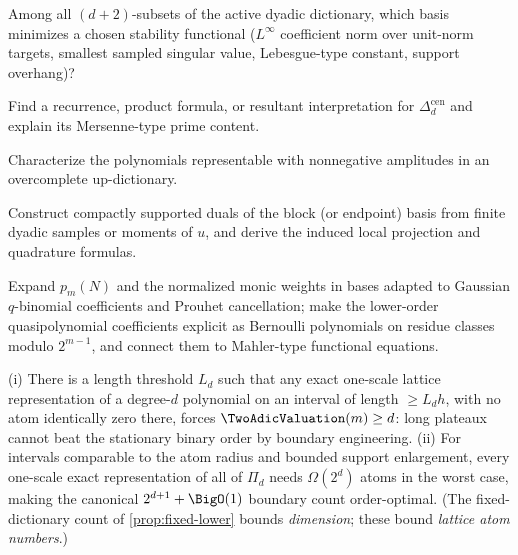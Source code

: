 \documentclass[11pt,oneside]{article}
\numberwithin{equation}{section}
\theoremstyle{definition}
\theoremstyle{remark}
\newcommand{\PiD}{\Pi_d}
\begin{document}
\begin{question}
\label{q:condition-basis}
Among all $(d+2)$-subsets of the active dyadic dictionary, which
basis minimizes a chosen stability functional ($L^\infty$ coefficient
norm over unit-norm targets, smallest sampled singular value,
Lebesgue-type constant, support overhang)?
\end{question}

\begin{question}
\label{q:central-det}
Find a recurrence, product formula, or resultant interpretation for
$\Delta^{\mathrm{cen}}_d$ and explain its Mersenne-type prime
content.
\end{question}

\begin{question}
\label{q:positive}
Characterize the polynomials representable with nonnegative
amplitudes in an overcomplete up-dictionary.
\end{question}

\begin{problem}
\label{prob:duals}
Construct compactly supported duals of the block (or endpoint) basis
from finite dyadic samples or moments of $u$, and derive the induced
local projection and quadrature formulas.
\end{problem}

\begin{problem}
\label{prob:weight-arithmetic}
Expand $p_m(N)$ and the normalized monic weights in bases adapted to
Gaussian $q$-binomial coefficients and Prouhet cancellation; make the
lower-order quasipolynomial coefficients explicit as Bernoulli
polynomials on residue classes modulo $2^{m-1}$, and connect them to
Mahler-type functional equations.
\end{problem}

\begin{conjecture}
\label{conj:lattice-minimality}
(i) There is a length threshold $L_d$ such that any exact one-scale
lattice representation of a degree-$d$ polynomial on an interval of
length $\ge L_dh$, with no atom identically zero there, forces
$\TwoAdicValuation(m)\ge d$: long plateaux cannot beat the stationary binary
order by boundary engineering.  (ii) For intervals comparable to the
atom radius and bounded support enlargement, every one-scale exact
representation of all of $\PiD$ needs $\Omega(2^{d})$ atoms in the
worst case, making the canonical $2^{d+1}+\BigO(1)$ boundary count
order-optimal.  (The fixed-dictionary count of
\cref{prop:fixed-lower} bounds \emph{dimension}; these bound
\emph{lattice atom numbers}.)
\end{conjecture}
\end{document}
